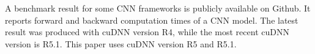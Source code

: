 A benchmark result for some CNN frameworks is publicly available on Github\cite{convnet-benchmarks}. It reports forward and backward computation times of a CNN model. The latest result was produced with cuDNN version R4, while the most recent cuDNN version is R5.1. This paper uses cuDNN version R5 and R5.1.
